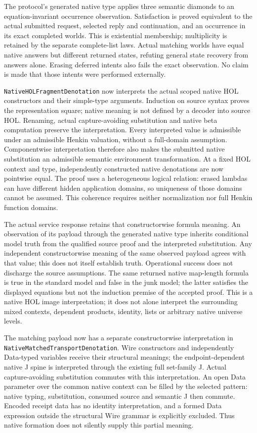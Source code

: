 \documentclass[11pt]{article}
\theoremstyle{definition}
\theoremstyle{remark}
\begin{document}
The protocol's generated native type applies three semantic diamonds to an
equation-invariant occurrence observation. Satisfaction is proved equivalent
to the actual submitted request, selected reply and continuation, and an
occurrence in its exact completed worlds. This is existential membership;
multiplicity is retained by the separate complete-list laws. Actual matching
worlds have equal native answers but different returned states, refuting
general state recovery from answers alone. Erasing deferred intents also
fails the exact observation. No claim is made that those intents were
performed externally.

\texttt{NativeHOLFragmentDenotation} now interprets the actual scoped native
HOL constructors and their simple-type arguments. Induction on source syntax
proves the representation square; native meaning is not defined by a decoder
into source HOL. Renaming, actual capture-avoiding substitution and native
beta computation preserve the interpretation. Every interpreted value is
admissible under an admissible Henkin valuation, without a full-domain
assumption. Componentwise interpretation therefore also makes the submitted
native substitution an admissible semantic environment transformation.
At a fixed HOL context and type, independently constructed native denotations
are now pointwise equal. The proof uses a heterogeneous logical relation:
erased lambdas can have different hidden application domains, so uniqueness
of those domains cannot be assumed. This coherence requires neither
normalization nor full Henkin function domains.

The actual service response retains that constructorwise formula meaning.
An observation of its payload through the generated native type inherits
conditional model truth from the qualified source proof and the interpreted
substitution. Any independent constructorwise meaning of the same observed
payload agrees with that value; this does not itself establish truth.
Operational success does not discharge the source assumptions.
The same returned native map-length formula is true in the standard model
and false in the junk model; the latter satisfies the displayed equations but
not the induction premise of the accepted proof. This is a native HOL image
interpretation; it does not alone interpret the surrounding mixed contexts,
dependent products, identity, lists or arbitrary native universe levels.

The matching payload now has a separate constructorwise interpretation in
\nolinkurl{NativeMatchedTransportDenotation}. Wire constructors and independently
Data-typed variables receive their structural meanings; the endpoint-dependent
native J spine is interpreted through the existing full set-family J.
Actual capture-avoiding substitution commutes with this interpretation.
An open Data parameter over the common native context can be filled by the
selected pattern: native typing, substitution, consumed source and semantic J
then commute. Encoded receipt data has no identity interpretation, and a
formed Data expression outside the structural Wire grammar is explicitly
excluded. Thus native formation does not silently supply this partial meaning.
\end{document}
